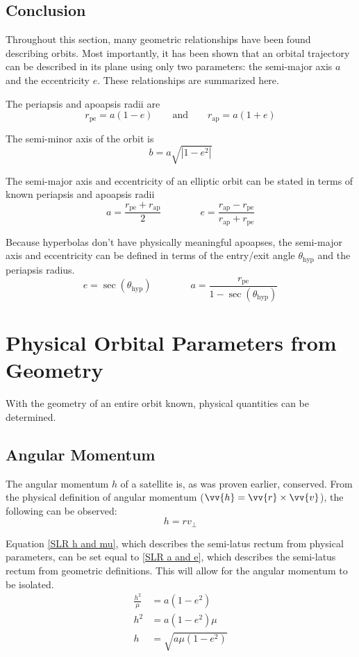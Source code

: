 \documentclass{article}
\begin{document}
\bigskip\bigskip
\subsection{Conclusion}

Throughout this section, many geometric relationships have been found describing orbits. Most importantly, it has been shown that an orbital trajectory can be described in its plane using only two parameters: the semi-major axis $a$ and the eccentricity $e$. These relationships are summarized here.

\bigskip
The periapsis and apoapsis radii are
$$r_\text{pe}=a(1-e)\qquad\text{and}\qquad r_\text{ap}=a(1+e)$$

\bigskip
The semi-minor axis of the orbit is
$$b=a\sqrt{|1-e^2|}$$

\bigskip
The semi-major axis and eccentricity of an elliptic orbit can be stated in terms of known periapsis and apoapsis radii
$$a=\frac{r_\text{pe}+r_\text{ap}}{2}\qquad\qquad e=\frac{r_\text{ap}-r_\text{pe}}{r_\text{ap}+r_\text{pe}}$$

Because hyperbolas don't have physically meaningful apoapses, the semi-major axis and eccentricity can be defined in terms of the entry/exit angle $\theta_\text{hyp}$ and the periapsis radius.
$$e=\sec(\theta_\text{hyp})\qquad\qquad a=\frac{{r_\text{pe}}}{1-\sec(\theta_\text{hyp})}$$

\pagebreak
\section{Physical Orbital Parameters from Geometry}\label{Orbital Parameters from Geometry}
With the geometry of an entire orbit known, physical quantities can be determined.

\bigskip\bigskip
\subsection{Angular Momentum}\label{sec:Angular Momentum Geometric}

The angular momentum $h$ of a satellite is, as was proven earlier, conserved. From the physical definition of angular momentum ($\vv{h}=\vv{r}\times\vv{v}$), the following can be observed:
\begin{equation}\label{Angular Momentum Physical Definition}
    h=rv_\perp
\end{equation}

Equation \eqref{SLR h and mu}, which describes the semi-latus rectum from physical parameters, can be set equal to \eqref{SLR a and e}, which describes the semi-latus rectum from geometric definitions. This will allow for the angular momentum to be isolated.
\begin{align*}
    \frac{h^2}{\mu} & = a(1-e^2)           \\
    h^2             & = a(1-e^2)\mu        \\
    h               & = \sqrt{a\mu(1-e^2)} \\
\end{align*}
\end{document}
